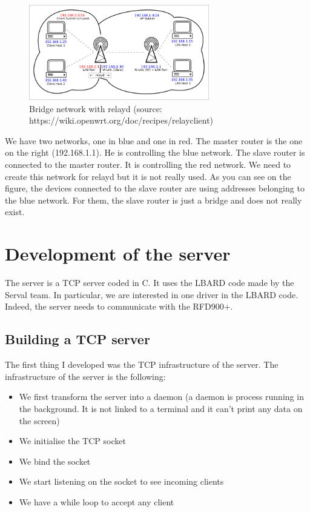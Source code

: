 \begin{figure}[H]
\begin{center}
\includegraphics[width=0.7\textwidth]{image/802-11-routed-relay.png}%
\caption{Bridge network with relayd (source: https://wiki.openwrt.org/doc/recipes/relayclient)}%
\label{figure:relayd}%
\end{center}
\end{figure}

We have two networks, one in blue and one in red. The master router is the one on the right (192.168.1.1). He is controlling the blue network. The slave router is connected to the master router. It is controlling the red network. We need to create this network for relayd but it is not really used. As you can see on the figure, the devices connected to the slave router are using addresses belonging to the blue network. For them, the slave router is just a bridge and does not really exist.





\section{Development of the server}

The server is a TCP server coded in C. It uses the LBARD code made by the Serval team. In particular, we are interested in one driver in the LBARD code. Indeed, the server needs to communicate with the RFD900+. 

\subsection{Building a TCP server}
The first thing I developed was the  TCP infrastructure of the server.
The infrastructure of the server is the following:
\begin{itemize}
	\item We first transform the server into a daemon (a daemon is process running in the background. It is not linked to a terminal and it can't print any data on the screen)
	\item We initialise the TCP socket
	\item We bind the socket
	\item We start listening on the socket to see incoming clients
	\item We have a while loop to accept any client
\end{itemize}

